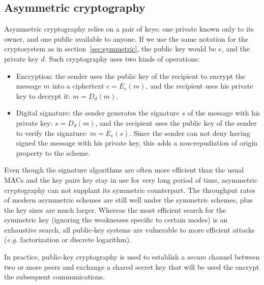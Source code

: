 \subsection{Asymmetric cryptography}
Asymmetric cryptography relies on a pair of keys: one private known only to its owner, and one public available to anyone.
If we use the same notation for the cryptosystem as in section~\ref{sec:symmetric}, the public key would be $e$, and the private key $d$.
Such cryptography uses two kinds of operations: 
\begin{itemize}
	\item Encryption: the sender uses the public key of the recipient to encrypt the message $m$ into a ciphertext $c = E_e(m)$, and the recipient uses his private key to decrypt it: $m = D_d(m)$.
	\item Digital signature: the sender generates the signature $s$ of the message with his private key: $s = D_d(m)$, and the recipient uses the public key of the sender to verify the signature: $m = E_e(s)$.
	Since the sender can not deny having signed the message with his private key, this adds a non-repudiation of origin property to the scheme.
\end{itemize}

Even though the signature algorithms are often more efficient than the usual MACs and the key pairs key stay in use for very long period of time, asymmetric cryptography can not supplant its symmetric counterpart.
The throughput rates of modern asymmetric schemes are still well under the symmetric schemes, plus the key sizes are much larger.
Whereas the most efficient search for the symmetric key (ignoring the weaknesses specific to certain modes) is an exhaustive search, all public-key systems are vulnerable to more efficient attacks (\textit{e.g.} factorization or discrete logarithm).

In practice, public-key cryptography is used to establish a secure channel between two or more peers and exchange a shared secret key that will be used the encrypt the subsequent communications.

